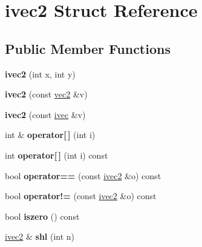 \hypertarget{structivec2}{}\section{ivec2 Struct Reference}
\label{structivec2}
\subsection*{Public Member Functions}
\begin{DoxyCompactItemize}
\item 
\mbox{\label{structivec2_a92576572e9c5d7e25064eb3d3c19b2f0}} 
{\bfseries ivec2} (int x, int y)
\item 
\mbox{\label{structivec2_ab59d78ca7d0fd368e0b862926c3ea5a2}} 
{\bfseries ivec2} (const \hyperlink{structvec2}{vec2} \&v)
\item 
\mbox{\label{structivec2_af46d770b556c90653caa9d8ec997a1a0}} 
{\bfseries ivec2} (const \hyperlink{structivec}{ivec} \&v)
\item 
\mbox{\label{structivec2_a2ea005d4846159afd40937e9311fafb3}} 
int \& {\bfseries operator\mbox{[}$\,$\mbox{]}} (int i)
\item 
\mbox{\label{structivec2_aaa7fbcd00bc6cfaa0655025c643e6861}} 
int {\bfseries operator\mbox{[}$\,$\mbox{]}} (int i) const
\item 
\mbox{\label{structivec2_a558d8899fb8aba5aa91617316edd8e6c}} 
bool {\bfseries operator==} (const \hyperlink{structivec2}{ivec2} \&o) const
\item 
\mbox{\label{structivec2_afb372cd5a723754f0066e07a66567d39}} 
bool {\bfseries operator!=} (const \hyperlink{structivec2}{ivec2} \&o) const
\item 
\mbox{\label{structivec2_a4b872772558056a31aac4bbe340ecf45}} 
bool {\bfseries iszero} () const
\item 
\mbox{\label{structivec2_a1d0858354d08ca682a9a437d61666624}} 
\hyperlink{structivec2}{ivec2} \& {\bfseries shl} (int n)
\item 
\mbox{\label{structivec2_a775d8f376981e375840f536e23a379b5}} 

\end{DoxyCompactItemize}
